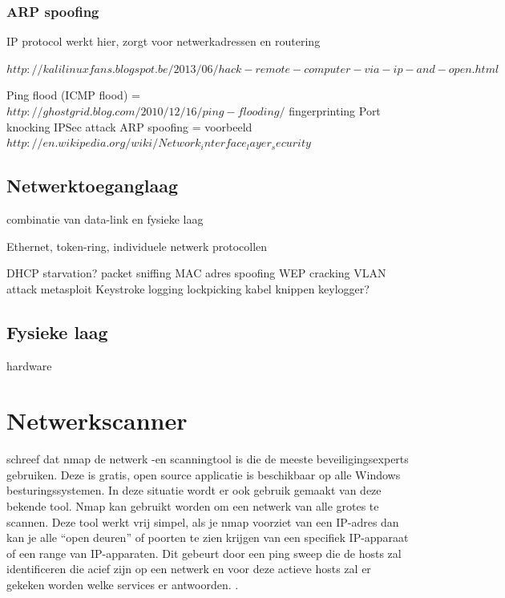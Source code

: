 \documentclass[pdftex,a4paper,12pt]{report}
\begin{document}
\subsubsection{ARP spoofing}




IP protocol werkt hier, zorgt voor netwerkadressen en routering

$http://kalilinuxfans.blogspot.be/2013/06/hack-remote-computer-via-ip-and-open.html$

Ping flood (ICMP flood) = $http://ghostgrid.blog.com/2010/12/16/ping-flooding/$
fingerprinting
Port knocking
IPSec attack
ARP spoofing = voorbeeld $http://en.wikipedia.org/wiki/Network_interface_layer_security$

\subsection{Netwerktoeganglaag}
combinatie van data-link en fysieke laag

Ethernet, token-ring, individuele netwerk protocollen 

DHCP starvation?
packet sniffing
MAC adres spoofing
WEP cracking
VLAN attack
metasploit
Keystroke logging
lockpicking
kabel knippen
keylogger?

\subsection{Fysieke laag}
hardware



\section{Netwerkscanner}
\cite{Jackson2010} schreef dat nmap de netwerk -en scanningtool is die de meeste beveiligingsexperts gebruiken. Deze is gratis, open source applicatie is beschikbaar op alle Windows besturingssystemen. In deze situatie wordt er ook gebruik gemaakt van deze bekende tool. Nmap kan gebruikt worden om een netwerk van alle grotes te scannen. Deze tool werkt vrij simpel, als je nmap voorziet van een IP-adres dan kan je alle "`open deuren"' of poorten te zien krijgen van een specifiek IP-apparaat of een range van IP-apparaten. Dit gebeurt door een ping sweep die de hosts zal identificeren die acief zijn op een netwerk en voor deze actieve hosts zal er gekeken worden welke services er antwoorden. \citep{Messer2007}. \newline
\end{document}
